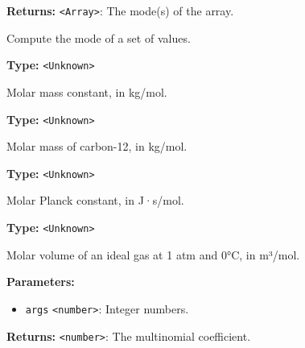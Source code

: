 \documentclass[12pt,a4paper]{article}
\begin{document}
\noindent \textbf{Returns:} \texttt{<Array>}: The mode(s) of the array.

\noindent Compute the mode of a set of values.

\vspace{5mm}
\noindent {}\vspace{4mm}


\noindent \textbf{Type:} \texttt{<Unknown>}

\noindent Molar mass constant, in kg/mol.

\vspace{5mm}
\noindent {}\vspace{4mm}


\noindent \textbf{Type:} \texttt{<Unknown>}

\noindent Molar mass of carbon-12, in kg/mol.

\vspace{5mm}
\noindent {}\vspace{4mm}


\noindent \textbf{Type:} \texttt{<Unknown>}

\noindent Molar Planck constant, in J·s/mol.

\vspace{5mm}
\noindent {}\vspace{4mm}


\noindent \textbf{Type:} \texttt{<Unknown>}

\noindent Molar volume of an ideal gas at 1 atm and 0°C, in m³/mol.

\vspace{5mm}
\noindent {}


\noindent \textbf{Parameters:}
\begin{itemize}
  \item \texttt{args} \texttt{<number>}: Integer numbers.
\end{itemize}

\noindent \textbf{Returns:} \texttt{<number>}: The multinomial coefficient.
\end{document}
